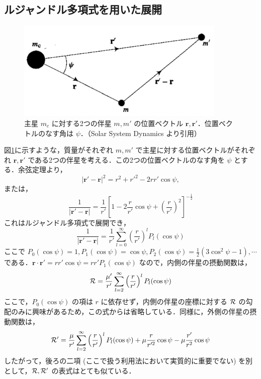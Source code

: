 \documentclass[11pt,a4paper,oneside,onecolumn]{jreport}
\begin{document}
\subsection{ルジャンドル多項式を用いた展開}
\begin{figure}[H]
\centering
\includegraphics[width=10cm]{./image/sec6_2.pdf}
\caption{主星 $m_c$ に対する2つの伴星 $m, m'$ の位置ベクトル ${\bm r}, {\bm r}'$．位置ベクトルのなす角は $\psi$．（Solar System Dynamics\cite{SSD} より引用）\label{fig:disturbingfunc_psi}}
\end{figure}
図\ref{fig:disturbingfunc_psi}に示すような，質量がそれぞれ $m, m'$ で主星に対する位置ベクトルがそれぞれ ${\bm r}, {\bm r'}$ である2つの伴星を考える．この2つの位置ベクトルのなす角を $\psi$ とする．余弦定理より，
\begin{equation}
|{\bm r'} - {\bm r}|^2 = r^2 + r'^2 - 2 r r' \cos \psi,
\end{equation}
または，
\begin{equation}
\frac{1}{|{\bm r'} - {\bm r}|} = \frac{1}{r'} \left[ 1 - 2 \frac{r}{r'} \cos \psi + \left( \frac{r}{r'} \right)^2 \right]^{-\frac{1}{2}}
\end{equation}
これはルジャンドル多項式で展開でき，
\begin{equation}
\frac{1}{|{\bm r'} - {\bm r}|} = \frac{1}{r'} \sum_{l = 0}^{\infty} \left( \frac{r}{r'} \right)^l P_l (\cos \psi)
\end{equation}
ここで $P_0 (\cos \psi) = 1, P_1 (\cos \psi) = \cos \psi, P_2 (\cos \psi) = \frac{1}{2} (3 \cos^2 \psi - 1), \cdots$ である．${\bm r} \cdot {\bm r'} = r r' \cos \psi = r r' P_1 (\cos \psi)$ なので，内側の伴星の摂動関数は，
\begin{equation}
{\cal R} = \frac{\mu'}{r'} \sum_{l = 2}^{\infty} \left( \frac{r}{r'} \right)^l P_l (\cos \psi) \label{eq:cal_R2}
\end{equation}
ここで，$P_0 (\cos \psi)$ の項は $r$ に依存せず，内側の伴星の座標に対する ${\cal R}$ の勾配のみに興味があるため，この式からは省略している．同様に，外側の伴星の摂動関数は，
\begin{equation}
{\cal R'} = \frac{\mu}{r'} \sum_{l = 2}^{\infty} \left( \frac{r}{r'} \right)^l P_l (\cos \psi) + \mu \frac{r}{r'^2} \cos \psi - \mu \frac{r'}{r^2} \cos \psi
\end{equation}
したがって，後ろの二項 (ここで扱う利用法において実質的に重要でない) を別として，${\cal R}, {\cal R'}$ の表式はとても似ている．
\end{document}
